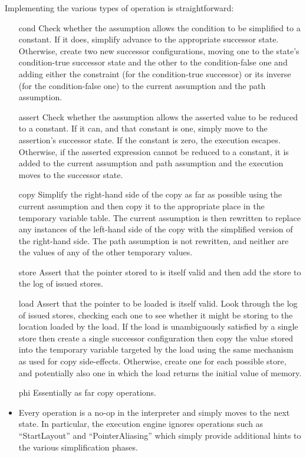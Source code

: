 Implementing the various types of \StateMachine operation is straightforward:

\begin{itemize}
\item[cond]
  Check whether the assumption allows the condition to be simplified to a constant.
  If it does, simplify advance to the appropriate successor state.
  Otherwise, create two new successor configurations, moving one to the state's condition-true successor state and the other to the condition-false one and adding either the constraint (for the condition-true successor) or its inverse (for the condition-false one) to the current assumption and the path assumption.
\item[assert]
  Check whether the assumption allows the asserted value to be reduced to a constant.
  If it can, and that constant is one, simply move to the assertion's successor state.
  If the constant is zero, the execution escapes.
  Otherwise, if the asserted expression cannot be reduced to a constant, it is added to the current assumption and path assumption and the execution moves to the successor state.
\item[copy]
  Simplify the right-hand side of the copy as far as possible using the current assumption and then copy it to the appropriate place in the temporary variable table.
  The current assumption is then rewritten to replace any instances of the left-hand side of the copy with the simplified version of the right-hand side.
  The path assumption is not rewritten, and neither are the values of any of the other temporary values.
\item[store]
  Assert that the pointer stored to is itself valid and then add the store to the log of issued stores.
\item[load]
  Assert that the pointer to be loaded is itself valid.
  Look through the log of issued stores, checking each one to see whether it might be storing to the location loaded by the load.
  If the load is unambiguously satisfied by a single store then create a single successor configuration then copy the value stored into the temporary variable targeted by the load using the same mechanism as used for copy side-effects.
  Otherwise, create one for each possible store, and potentially also one in which the load returns the initial value of memory.
\item[phi]
  Essentially as far copy operations.
\item
  Every operation is a no-op in the interpreter and simply moves to the next state.
  In particular, the execution engine ignores operations such as ``StartLayout'' and ``PointerAliasing'' which simply provide additional hints to the various \StateMachine simplification phases.
\end{itemize}

